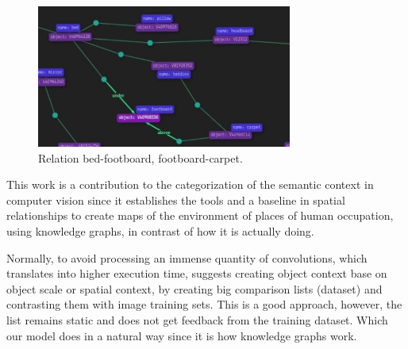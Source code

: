 \begin{figure}[H]
    \centering
    \includegraphics[width=8.4cm]{figures/realcionGrafo.jpeg}
    \caption{Relation bed-footboard, footboard-carpet.}
    \label{fig:ReGra}
\end{figure}

This work is a contribution to the categorization of the semantic context in 
computer vision since it establishes the tools and a baseline in spatial 
relationships to create maps of the environment of places of human occupation, 
using knowledge graphs, in contrast of how it is actually doing.

Normally, to avoid processing an immense quantity of convolutions, which 
translates into higher execution time, \cite{Galleguillos} suggests creating 
object context base on object scale or spatial context, by creating big 
comparison lists (dataset) and contrasting them with image training sets. 
This is a good approach, however, the list remains static and does not get 
feedback from the training dataset. Which our model does in a natural way since 
it is how knowledge graphs work.